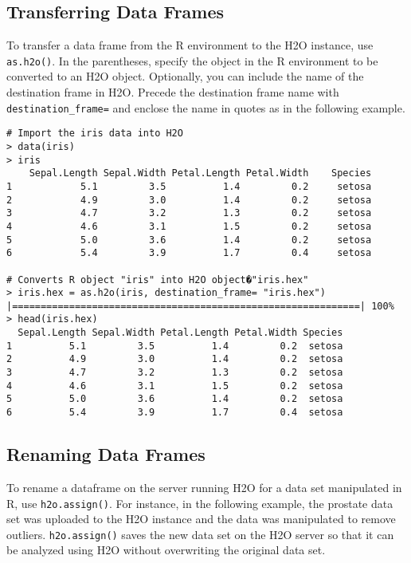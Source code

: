 \subsection{Transferring Data Frames}
To transfer a data frame from the R environment to the H2O instance, use  {\texttt{as.h2o()}}. In the parentheses, specify the object in the R environment to be converted to an H2O object. Optionally, you can include the name of the destination frame in H2O. Precede the destination frame name with {\texttt{destination_frame=}} and enclose the name in quotes as in the following example.

\begin{lstlisting}[style=R]
# Import the iris data into H2O
> data(iris)
> iris
    Sepal.Length Sepal.Width Petal.Length Petal.Width    Species
1            5.1         3.5          1.4         0.2     setosa
2            4.9         3.0          1.4         0.2     setosa
3            4.7         3.2          1.3         0.2     setosa
4            4.6         3.1          1.5         0.2     setosa
5            5.0         3.6          1.4         0.2     setosa
6            5.4         3.9          1.7         0.4     setosa

# Converts R object "iris" into H2O object�"iris.hex"
> iris.hex = as.h2o(iris, destination_frame= "iris.hex")
|=============================================================| 100%
> head(iris.hex)
  Sepal.Length Sepal.Width Petal.Length Petal.Width Species
1          5.1         3.5          1.4         0.2  setosa
2          4.9         3.0          1.4         0.2  setosa
3          4.7         3.2          1.3         0.2  setosa
4          4.6         3.1          1.5         0.2  setosa
5          5.0         3.6          1.4         0.2  setosa
6          5.4         3.9          1.7         0.4  setosa
\end{lstlisting}


\subsection{Renaming Data Frames}

To rename a dataframe on the server running H2O for a data set manipulated in R, use {\texttt{h2o.assign()}}. For instance, in the following example, the prostate data set was uploaded to the H2O instance and the data was manipulated to remove outliers. {\texttt{h2o.assign()}} saves the new data set on the H2O server so that it can be analyzed using H2O without overwriting the original data set.  

